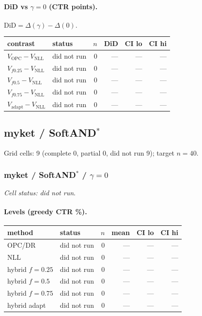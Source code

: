 \documentclass[10pt,a4paper]{article}
\begin{document}
\paragraph{DiD vs $\gamma=0$ (CTR points).} $\mathrm{DiD}=\Delta(\gamma)-\Delta(0)$.
{\centering\small\begin{tabular}{llrrrr}
\toprule contrast & status & $n$ & DiD & CI lo & CI hi \\
\midrule
$V_{\mathrm{OPC}}-V_{\mathrm{NLL}}$ & did not run & 0 & --- & --- & --- \\
$V_{f0.25}-V_{\mathrm{NLL}}$ & did not run & 0 & --- & --- & --- \\
$V_{f0.5}-V_{\mathrm{NLL}}$ & did not run & 0 & --- & --- & --- \\
$V_{f0.75}-V_{\mathrm{NLL}}$ & did not run & 0 & --- & --- & --- \\
$V_{\mathrm{adapt}}-V_{\mathrm{NLL}}$ & did not run & 0 & --- & --- & --- \\
\bottomrule\end{tabular}\par}
\bigskip
\newpage
\subsection{myket / SoftAND$^*$}
Grid cells: 9 (complete 0, partial 0, did not run 9); target $n=40$.
\subsubsection{myket / SoftAND$^*$ / $\gamma=0$}
\emph{Cell status: did not run}.
\paragraph{Levels (greedy CTR \%).}
{\centering\small\begin{tabular}{llrrrr}
\toprule method & status & $n$ & mean & CI lo & CI hi \\
\midrule
OPC/DR & did not run & 0 & --- & --- & --- \\
NLL & did not run & 0 & --- & --- & --- \\
hybrid $f{=}0.25$ & did not run & 0 & --- & --- & --- \\
hybrid $f{=}0.5$ & did not run & 0 & --- & --- & --- \\
hybrid $f{=}0.75$ & did not run & 0 & --- & --- & --- \\
hybrid adapt & did not run & 0 & --- & --- & --- \\
\bottomrule\end{tabular}\par}
\end{document}
